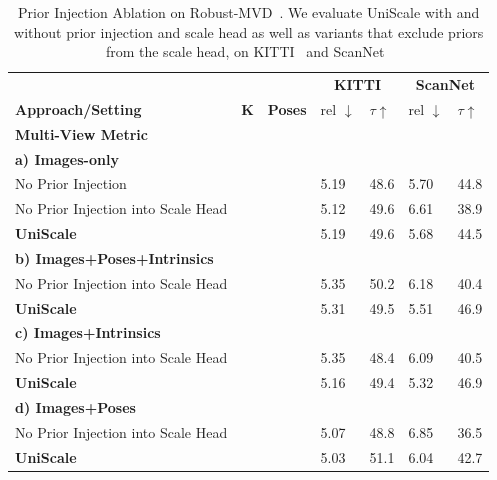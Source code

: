\documentclass[letterpaper, 10 pt, conference]{ieeeconf}  %
\newcommand{\cmark}{\ding{51}}
\newcommand{\xmark}{\ding{55}}
\begin{document}
\begin{table}[t]
  \centering
  \scriptsize
  \caption{Prior Injection Ablation on Robust-MVD~\cite{schroppel2022benchmark}. We evaluate UniScale with and without prior injection and scale head as well as variants that exclude priors from the scale head, on KITTI~\cite{geiger2013vision} and ScanNet~\cite{dai2017scannet}} 
\begin{tabular}{p{3.4cm}p{0.1cm}p{0.3cm}p{0.5cm}p{0.5cm}p{0.5cm}p{0.3cm}}
 \hline
  &  &   & \multicolumn{2}{c}{\textbf{KITTI}} & \multicolumn{2}{c}{\textbf{ScanNet}}\\
\textbf{Approach/Setting}  & \textbf{K} & \textbf{Poses}  & {rel $\downarrow$} & {$\tau\uparrow$} & {rel $\downarrow$} & {$\tau\uparrow$} \\
\hline 

\multicolumn{7}{l}{\textbf{Multi-View Metric}} \\
\hline 
\multicolumn{7}{l}{\textbf{a) Images-only}} \\
No Prior Injection & \xmark & \xmark  & 5.19 & 48.6 & 5.70 & 44.8\\
No Prior Injection into Scale Head & \xmark & \xmark  & 5.12 & 49.6 & 6.61 & 38.9\\
\textbf{UniScale} & \xmark & \xmark  & 5.19 & 49.6 & 5.68 & 44.5 \\
\hline
\multicolumn{7}{l}{\textbf{b) Images+Poses+Intrinsics}} \\

No Prior Injection into Scale Head & \cmark & \cmark  & 5.35 & 50.2 & 6.18 & 40.4\\
\textbf{UniScale} & \cmark & \cmark & 5.31 & 49.5 & 5.51 &  46.9\\
\hline
\multicolumn{7}{l}{\textbf{c) Images+Intrinsics}} \\
No Prior Injection into Scale Head & \cmark & \xmark  & 5.35 & 48.4 & 6.09 & 40.5\\
\textbf{UniScale} & \cmark & \xmark & 5.16 & 49.4 & 5.32 & 46.9 \\
\hline
\multicolumn{7}{l}{\textbf{d) Images+Poses}} \\
No Prior Injection into Scale Head & \xmark & \cmark  & 5.07 & 48.8 & 6.85 & 36.5\\
\textbf{UniScale} & \xmark & \cmark & 5.03 & 51.1 & 6.04 &  42.7\\
\hline


\end{tabular}
\end{table}
\end{document}
